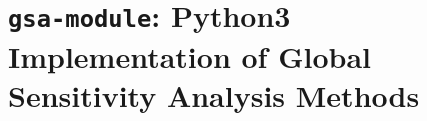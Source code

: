 \chapter[\texttt{gsa-module}]{\texttt{gsa-module}: Python3 Implementation of Global Sensitivity Analysis Methods}
\label{app:gsa_module}
